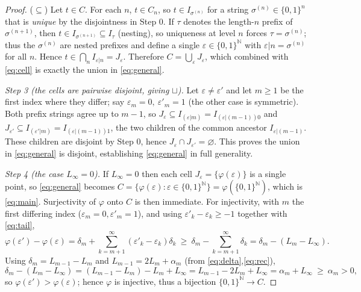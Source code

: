 \documentclass{amsart}
\theoremstyle{definition}
\theoremstyle{remark}
\begin{document}
\begin{proof}
($\subseteq$) Let $t\in C$. For each $n$, $t\in C_n$, so $t\in I_{\sigma^{(n)}}$
for a string $\sigma^{(n)}\in\{0,1\}^n$ that is \emph{unique} by the disjointness
in Step 0. If $\tau$ denotes the length-$n$ prefix of $\sigma^{(n+1)}$, then
$t\in I_{\sigma^{(n+1)}}\subseteq I_\tau$ (nesting), so uniqueness at level $n$
forces $\tau=\sigma^{(n)}$; thus the $\sigma^{(n)}$ are nested prefixes and define
a single $\varepsilon\in\{0,1\}^{\mathbb N}$ with $\varepsilon|n=\sigma^{(n)}$ for
all $n$. Hence $t\in\bigcap_n I_{\varepsilon|n}=J_\varepsilon$. Therefore
$C=\bigcup_{\varepsilon}J_\varepsilon$, which combined with \eqref{eq:cell} is
exactly the union in \eqref{eq:general}.

\smallskip
\emph{Step 3 (the cells are pairwise disjoint, giving $\sqcup$).}
Let $\varepsilon\ne\varepsilon'$ and let $m\ge1$ be the first index where they
differ; say $\varepsilon_m=0,\ \varepsilon'_m=1$ (the other case is symmetric).
Both prefix strings agree up to $m-1$, so $J_\varepsilon\subseteq I_{(\varepsilon|m)}
=I_{(\varepsilon|(m-1))0}$ and $J_{\varepsilon'}\subseteq I_{(\varepsilon'|m)}
=I_{(\varepsilon|(m-1))1}$, the two children of the common ancestor
$I_{\varepsilon|(m-1)}$. These children are disjoint by Step 0, hence
$J_\varepsilon\cap J_{\varepsilon'}=\varnothing$. This proves the union in
\eqref{eq:general} is disjoint, establishing \eqref{eq:general} in full
generality.

\smallskip
\emph{Step 4 (the case $L_\infty=0$).}
If $L_\infty=0$ then each cell $J_\varepsilon=\{\varphi(\varepsilon)\}$ is a single
point, so \eqref{eq:general} becomes
$C=\{\varphi(\varepsilon):\varepsilon\in\{0,1\}^{\mathbb N}\}
=\varphi(\{0,1\}^{\mathbb N})$, which is \eqref{eq:main}. Surjectivity of
$\varphi$ onto $C$ is then immediate. For injectivity, with $m$ the first
differing index ($\varepsilon_m=0,\varepsilon'_m=1$), and using
$\varepsilon'_k-\varepsilon_k\ge-1$ together with \eqref{eq:tail},
\[
\varphi(\varepsilon')-\varphi(\varepsilon)
=\delta_m+\sum_{k=m+1}^{\infty}(\varepsilon'_k-\varepsilon_k)\delta_k
\ \ge\ \delta_m-\sum_{k=m+1}^{\infty}\delta_k
=\delta_m-(L_m-L_\infty).
\]
Using $\delta_m=L_{m-1}-L_m$ and $L_{m-1}=2L_m+\alpha_m$ (from
\eqref{eq:delta},\eqref{eq:rec}),
\[
\delta_m-(L_m-L_\infty)=(L_{m-1}-L_m)-L_m+L_\infty=L_{m-1}-2L_m+L_\infty
=\alpha_m+L_\infty\ \ge\ \alpha_m>0,
\]
so $\varphi(\varepsilon')>\varphi(\varepsilon)$; hence $\varphi$ is injective, thus
a bijection $\{0,1\}^{\mathbb N}\to C$.
\end{proof}
\end{document}
